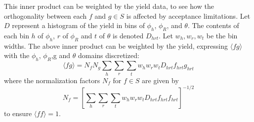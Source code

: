 \documentclass[12pt]{article}
\begin{document}
This inner product can be weighted by the yield data, to see how the
orthogonality between each $f$ and $g\in S$ is affected by acceptance
limitations.  Let $D$ represent a histogram of the yield in bins of $\phi_h$,
$\phi_R$, and $\theta$.  The contents of each bin $h$ of $\phi_h$, $r$ of
$\phi_R$ and $t$ of $\theta$ is denoted $D_{hrt}$. Let $w_h,w_r,w_t$ be the bin
widths.  The above inner product can be weighted by the yield, expressing
$\langle fg\rangle$ with the $\phi_h$, $\phi_R$,g and $\theta$ domains
discretized:
\begin{equation}
\displaystyle
\langle fg\rangle=
N_fN_g
\sum_h\sum_r\sum_t
w_hw_rw_tD_{hrt}f_{hrt}g_{hrt}
\end{equation}
where the normalization factors $N_f$ for $f\in S$ are given by
\begin{equation}
N_f=
\left[
\sum_h\sum_r\sum_t
w_hw_rw_tD_{hrt}f_{hrt}f_{hrt}
\right]^{-1/2}
\end{equation}
to ensure $\langle ff\rangle=1$.
\end{document}
